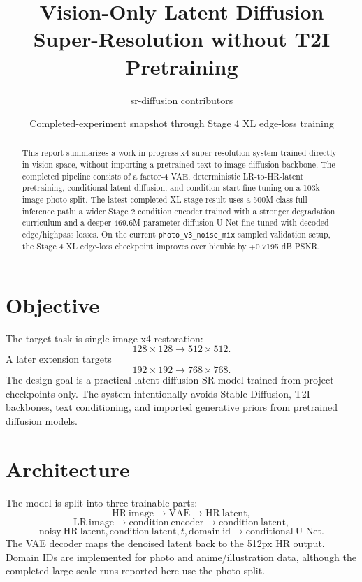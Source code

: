 \documentclass[10pt]{article}
\title{Vision-Only Latent Diffusion Super-Resolution without T2I Pretraining}
\author{sr-diffusion contributors}
\date{Completed-experiment snapshot through Stage 4 XL edge-loss training}
\begin{document}
\maketitle

\begin{abstract}
This report summarizes a work-in-progress x4 super-resolution system trained
directly in vision space, without importing a pretrained text-to-image diffusion
backbone. The completed pipeline consists of a factor-4 VAE, deterministic
LR-to-HR-latent pretraining, conditional latent diffusion, and
condition-start fine-tuning on a 103k-image photo split. The latest completed
XL-stage result uses a 500M-class full inference path: a wider Stage 2
condition encoder trained with a stronger degradation curriculum and a deeper
469.6M-parameter diffusion U-Net fine-tuned with decoded edge/highpass losses.
On the current \texttt{photo\_v3\_noise\_mix} sampled validation setup, the
Stage 4 XL edge-loss checkpoint improves over bicubic by +0.7195 dB PSNR.
\end{abstract}

\section{Objective}

The target task is single-image x4 restoration:
\[
128 \times 128 \rightarrow 512 \times 512.
\]
A later extension targets
\[
192 \times 192 \rightarrow 768 \times 768.
\]
The design goal is a practical latent diffusion SR model trained from project
checkpoints only. The system intentionally avoids Stable Diffusion, T2I
backbones, text conditioning, and imported generative priors from pretrained
diffusion models.

\section{Architecture}

The model is split into three trainable parts:
\[
\mathrm{HR\ image} \rightarrow \mathrm{VAE} \rightarrow \mathrm{HR\ latent},
\]
\[
\mathrm{LR\ image} \rightarrow \mathrm{condition\ encoder} \rightarrow
\mathrm{condition\ latent},
\]
\[
\mathrm{noisy\ HR\ latent}, \mathrm{condition\ latent}, t,
\mathrm{domain\ id} \rightarrow \mathrm{conditional\ U\mbox{-}Net}.
\]
The VAE decoder maps the denoised latent back to the 512px HR output. Domain IDs
are implemented for photo and anime/illustration data, although the completed
large-scale runs reported here use the photo split.
\end{document}
